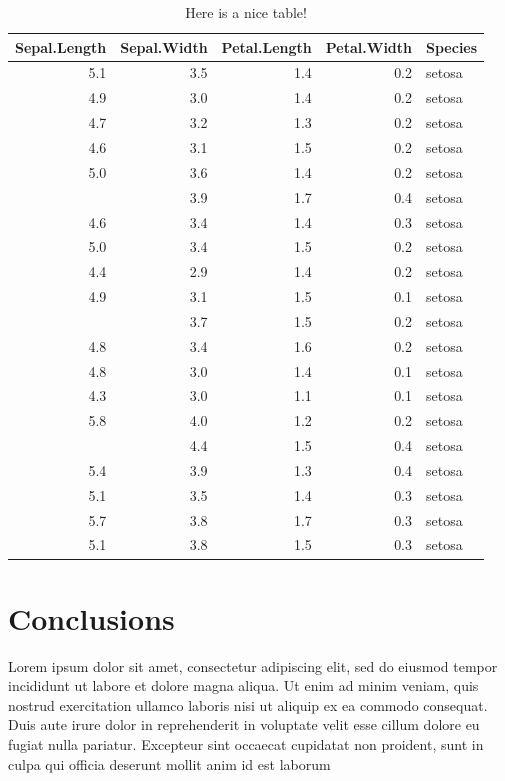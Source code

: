 \documentclass[fontsize=11pt, %
                             paper=a4, %
                             twoside, %
                             captions=tableheading,
                             index=totoc,
                             hyperref]{labbook}
\theoremstyle{definition}
\theoremstyle{definition}
\theoremstyle{remark}
\begin{document}
\begin{addmargin}[4cm]{0cm}
\begin{table}
\caption{\label{tab:tab1}Here is a nice table!}
\centering
\begin{tabular}[t]{rrrrl}
\toprule
Sepal.Length & Sepal.Width & Petal.Length & Petal.Width & Species\\
\midrule
5.1 & 3.5 & 1.4 & 0.2 & setosa\\
4.9 & 3.0 & 1.4 & 0.2 & setosa\\
4.7 & 3.2 & 1.3 & 0.2 & setosa\\
4.6 & 3.1 & 1.5 & 0.2 & setosa\\
5.0 & 3.6 & 1.4 & 0.2 & setosa\\
\addlinespace
5.4 & 3.9 & 1.7 & 0.4 & setosa\\
4.6 & 3.4 & 1.4 & 0.3 & setosa\\
5.0 & 3.4 & 1.5 & 0.2 & setosa\\
4.4 & 2.9 & 1.4 & 0.2 & setosa\\
4.9 & 3.1 & 1.5 & 0.1 & setosa\\
\addlinespace
5.4 & 3.7 & 1.5 & 0.2 & setosa\\
4.8 & 3.4 & 1.6 & 0.2 & setosa\\
4.8 & 3.0 & 1.4 & 0.1 & setosa\\
4.3 & 3.0 & 1.1 & 0.1 & setosa\\
5.8 & 4.0 & 1.2 & 0.2 & setosa\\
\addlinespace
5.7 & 4.4 & 1.5 & 0.4 & setosa\\
5.4 & 3.9 & 1.3 & 0.4 & setosa\\
5.1 & 3.5 & 1.4 & 0.3 & setosa\\
5.7 & 3.8 & 1.7 & 0.3 & setosa\\
5.1 & 3.8 & 1.5 & 0.3 & setosa\\
\bottomrule
\end{tabular}
\end{table}

\chapter{Conclusions}\label{conclusions}

Lorem ipsum dolor sit amet, consectetur adipiscing elit, sed do eiusmod
tempor incididunt ut labore et dolore magna aliqua. Ut enim ad minim
veniam, quis nostrud exercitation ullamco laboris nisi ut aliquip ex ea
commodo consequat. Duis aute irure dolor in reprehenderit in voluptate
velit esse cillum dolore eu fugiat nulla pariatur. Excepteur sint
occaecat cupidatat non proident, sunt in culpa qui officia deserunt
mollit anim id est laborum

%

\end{addmargin}


\end{document}
